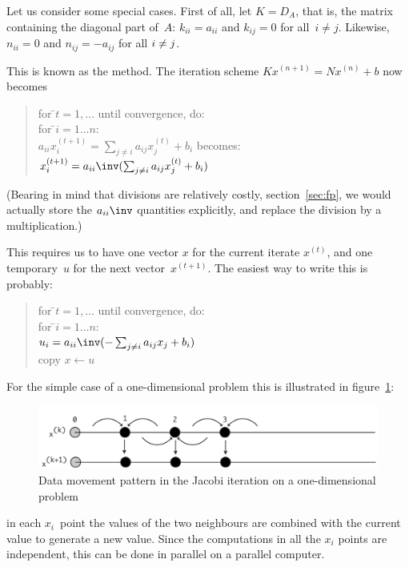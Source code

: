 Let us consider some special cases. First of all, let $K=D_A$, that
is, the matrix containing the diagonal part of~$A$: $k_{ii}=a_{ii}$
and $k_{ij}=0$ for all~\mbox{$i\not=j$}. 
Likewise, $n_{ii}=0$ and $n_{ij}=-a_{ij}$ for all $i\not=\nobreak j$.

This is known as the
 method. The iteration scheme
$Kx^{(n+1)}=Nx^{(n)}+b$
now becomes
\begin{quote}
  \begin{tabbing}
    for \=$t=1,\ldots$ until convergence, do:\\
    \>for \=$i=1\ldots n$:\\
    \>\>{\tt //} $a_{ii}x^{(t+1)}_i = \sum_{j\not=i}
    a_{ij}x^{(t)}_j+b_i$ becomes:\\
    \>\>$x^{(t+1)}_i = a_{ii}\inv(\sum_{j\not=i} a_{ij}x^{(t)}_j+b_i)$
  \end{tabbing}
\end{quote}
(Bearing in mind that divisions are relatively costly,
section~\ref{sec:fp}, we would actually store the $a_{ii}\inv$
quantities explicitly, and replace the division by a multiplication.)

This requires us to have one vector $x$ for the current iterate
$x^{(t)}$, and one temporary~$u$ for the next vector~$x^{(t+1)}$. The
easiest way to write this is probably:
\begin{quote}
  \begin{tabbing}
    for \=$t=1,\ldots$ until convergence, do:\\
    \>for \=$i=1\ldots n$:\\
    \>\>$u_i = a_{ii}\inv (-\sum_{j\not=i} a_{ij}x_j+b_i)$\\
    \>copy $x\leftarrow u$
  \end{tabbing}
\end{quote}
For the simple case of a one-dimensional problem this is illustrated
in figure~\ref{fig:1d-jacobi}:
\begin{figure}[ht]
  \includegraphics[scale=.08]{graphics-public/jacobi}
  \caption{Data movement pattern in the Jacobi iteration on a
    one-dimensional problem}
  \label{fig:1d-jacobi}
\end{figure}
in each $x_i$~point the values of the two neighbours are combined with
the current value to generate a new value. Since the computations in
all the $x_i$ points are independent, this can be done
in parallel on a parallel computer.

